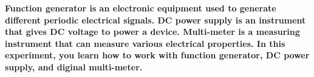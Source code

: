 \documentclass[11pt]{article}
\begin{document}
\textbf{Function generator is an electronic equipment used to generate different periodic electrical signals. DC power supply is an instrument that gives DC voltage to power a device. Multi-meter is a measuring instrument that can measure various electrical properties. In this experiment, you learn how to work with function generator, DC power supply, and diginal multi-meter.
}



\end{document}

